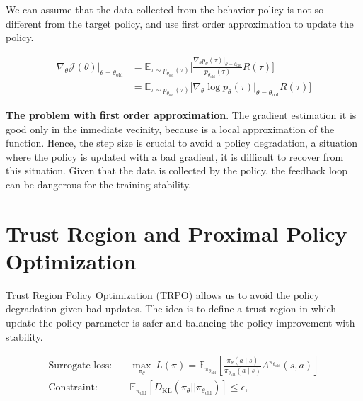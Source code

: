 \noindent We can assume that the data collected from the behavior policy is
not so different from the target policy, and use first order approximation to
update the policy. 

\begin{equation}\label{eqn:rl-objective-is-linear-aprox}
    \begin{split}
        \nabla_{\theta}\mathcal{J}(\theta)\rvert_{\theta=\theta_{\text{old}}} &= \mathbb{E}_{\tau\sim p_{\theta_{\text{old}}}(\tau)} \bigg[\frac{\nabla_{\theta} p_{\theta}(\tau)\rvert_{\theta=\theta_{\text{old}}}}{p_{\theta_{\text{old}}}(\tau)} R(\tau)\bigg] \\
        &= \mathbb{E}_{\tau\sim p_{\theta_{\text{old}}}(\tau)} \big[\nabla_{\theta}\log p_{\theta}(\tau)\rvert_{\theta=\theta_{\text{old}}} R(\tau) \big]
    \end{split}
\end{equation}


\noindent \textbf{The problem with first order approximation}. The gradient estimation it is good only in the inmediate vecinity, because is a local approximation of the function. Hence, the step size is crucial to avoid a policy degradation, a situation where the policy is updated with a bad gradient,
it is difficult to recover from this situation. Given that the data is collected by the policy, the feedback loop can be dangerous for the training
stability. \\

\section{Trust Region and Proximal Policy Optimization}\label{sec:trpo-ppo}

Trust Region Policy Optimization (TRPO) \cite{schulman2015trust} allows us to
avoid the policy degradation given bad updates. The idea is to 
define a trust region in which update the policy parameter is safer and
balancing the policy improvement with stability.

\begin{align}
    \text{Surrogate loss:} \quad & \underset{\pi_{\theta}}{\max}~L(\pi) = \mathbb{E}_{\pi_{\theta_{\text{old}}}} \left[ \frac{\pi_{\theta}(a\mid s)}{\pi_{\theta_{\text{old}}}(a\mid s)} A^{\pi_{\theta_{\text{old}}}}(s, a) \right] \label{eqn:trpo-loss} \\
    \text{Constraint:} \quad & \mathbb{E}_{\pi_{\text{old}}} \left[ D_{\text{KL}}(\pi_{\theta} || \pi_{\theta_{\text{old}}}) \right]  \leq \epsilon, \nonumber
\end{align}

